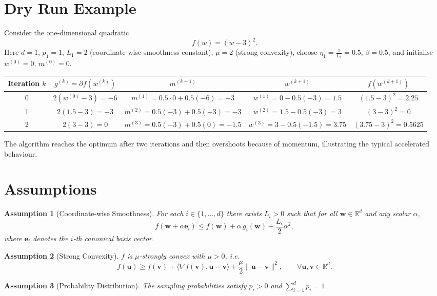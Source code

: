 \documentclass{article}
\newtheorem{assumption}{Assumption}
\newcommand{\R}{\mathbb{R}}
\begin{document}
\section*{Dry Run Example}
Consider the one‑dimensional quadratic 
\[
f(w)=(w-3)^2 .
\]
Here $d=1$, $p_1=1$, $L_1=2$ (coordinate‑wise smoothness constant), $\mu=2$ (strong convexity),
choose $\eta_1=\tfrac{1}{L_1}=0.5$, $\beta=0.5$, and initialise $w^{(0)}=0$, $m^{(0)}=0$.

\begin{center}
\begin{tabular}{c|c|c|c|c}
Iteration $k$ & $g^{(k)}=\partial f(w^{(k)})$ & $m^{(k+1)}$ & $w^{(k+1)}$ & $f(w^{(k+1)})$\\ \hline
0 & $2(w^{(0)}-3)=-6$ & $m^{(1)}=0.5\cdot0+0.5(-6)=-3$ & $w^{(1)}=0-0.5(-3)=1.5$ & $(1.5-3)^2=2.25$\\
1 & $2(1.5-3)=-3$ & $m^{(2)}=0.5(-3)+0.5(-3)=-3$ & $w^{(2)}=1.5-0.5(-3)=3$ & $(3-3)^2=0$\\
2 & $2(3-3)=0$ & $m^{(3)}=0.5(-3)+0.5(0)=-1.5$ & $w^{(3)}=3-0.5(-1.5)=3.75$ & $(3.75-3)^2=0.5625$\\
\end{tabular}
\end{center}
The algorithm reaches the optimum after two iterations and then overshoots because of momentum, illustrating the typical accelerated behaviour.

\newpage
\section*{Assumptions}
\begin{assumption}[Coordinate‑wise Smoothness]\label{ass:smooth}
For each $i\in\{1,\dots ,d\}$ there exists $L_i>0$ such that for all $\mathbf w\in\R^{d}$ and any scalar $\alpha$,
\[
f(\mathbf w+ \alpha \mathbf e_i)\le f(\mathbf w)+\alpha\,g_i(\mathbf w)+\frac{L_i}{2}\alpha^{2},
\]
where $\mathbf e_i$ denotes the $i$‑th canonical basis vector.
\end{assumption}

\begin{assumption}[Strong Convexity]\label{ass:strong}
$f$ is $\mu$‑strongly convex with $\mu>0$, i.e.
\[
f(\mathbf u)\ge f(\mathbf v)+\langle\nabla f(\mathbf v),\mathbf u-\mathbf v\rangle+\frac{\mu}{2}\|\mathbf u-\mathbf v\|^{2},
\qquad\forall\mathbf u,\mathbf v\in\R^{d}.
\]
\end{assumption}

\begin{assumption}[Probability Distribution]\label{ass:prob}
The sampling probabilities satisfy $p_i>0$ and $\sum_{i=1}^{d}p_i=1$.
\end{assumption}
\end{document}
